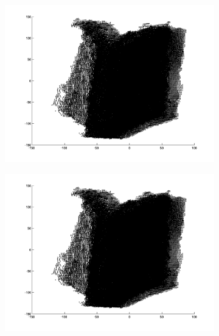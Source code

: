 \begin{figure}[H]
	\begin{subfigure}[b]{0.3\textwidth}
		\centering
		\includegraphics[width=\textwidth]{Images/Book10.png}
		\caption{}
	\end{subfigure}%
	\begin{subfigure}[b]{0.3\textwidth}
		\centering
		\includegraphics[width=\textwidth]{Images/Book11.png}
		\caption{}
	\end{subfigure}
	\begin{subfigure}[b]{0.3\textwidth}
		\centering

\end{subfigure}
\end{figure}

